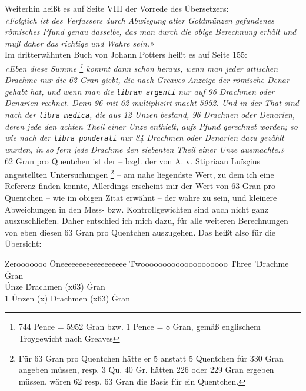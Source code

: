 \documentclass[a5paper,fontsize=10pt]{memoir}
\newcommand\ouncesofpound{12}
\newcommand\quentinsofounce{8}
\newcommand\gransofquentins{63}
\begin{document}
Weiterhin heißt es auf Seite VIII der Vorrede des Übersetzers:\\

\emph{«Folglich ist des Verfassers durch Abwiegung
alter Goldmünzen gefundenes römisches Pfund genau dasselbe,
das man durch die obige Berechnung erhält
und muß daher das richtige und Wahre sein.»}\\

Im dritterwähnten Buch von Johann Potters
heißt es auf Seite 155:\\

\emph{«Eben diese Summe%
\footnote{744 Pence = 5952 Gran bzw. 1 Pence = 8 Gran,
gemäß englischem Troygewicht nach Greaves}
kommt dann schon heraus,
wenn man jeder attischen Drachme nur die 62 Gran giebt,
die nach Greaves Anzeige der römische Denar gehabt hat,
und wenn man die \texttt{libram argenti} nur auf 96 Drachmen
oder Denarien rechnet.
Denn 96 mit 62 multiplicirt macht 5952.
Und in der That sind nach der \texttt{libra medica},
die aus 12 Unzen bestand, 96 Drachnen oder Denarien,
deren jede den achten Theil einer Unze enthielt,
aufs Pfund gerechnet worden;
so wie nach der \texttt{libra ponderali} nur 84 Drachmen
oder Denarien dazu gezählt wurden,
in so fern jede Drachme den siebenten Theil einer Unze ausmachte.»}\\

62 Gran pro Quentchen ist der
-- bzgl. der von A. v. Stipriaan Luïsçius angestellten Untersuchungen%
\footnote{Für 63 Gran pro Quentchen
hätte er 5 anstatt 5 Quentchen
für 330 Gran angeben müssen,
resp. 3 Qu. 40 Gr. hätten 226 oder 229 Gran ergeben müssen,
wären 62 resp. 63 Gran die Basis für ein Quentchen.}%
-- am nahe liegendste Wert,
zu dem ich eine Referenz finden konnte,
Allerdings erscheint mir der Wert von 63 Gran pro Quentchen
-- wie im obigen Zitat erwähnt
-- der wahre zu sein,
und kleinere Abweichungen in den Mess- bzw. Kontrollgewichten
sind auch nicht ganz auszuschließen. Daher entschied ich mich dazu,
für alle weiteren Berechnungen 
von eben diesen 63 Gran pro Quentchen auszugehen. 
Das heißt also für die Übersicht:\\

\noindent
\begin{minipage}{\linewidth}
\begin{tabbing}
Zerooooooo \= Oneeeeeeeeeeeeeeeeee \= Twoooooooooooooooooooo \= Three      \kill
           \>  \'                  \'Drachme             \>  \gransofquentins\'Gran \\
           \'Unze              \> \quentinsofounce\'Drachmen (x\gransofquentins)      \> \fpeval{\quentinsofounce * \gransofquentins}\'Gran \\
1 \Pfund   \>\ouncesofpound\'Unzen (x\fpeval{\quentinsofounce * \gransofquentins})      \>\fpeval{\ouncesofpound * \quentinsofounce}\'Drachmen (x\gransofquentins)      \>\fpeval{\ouncesofpound * \quentinsofounce * \gransofquentins}\'Gran \\
\end{tabbing}
\end{minipage}
\end{document}
